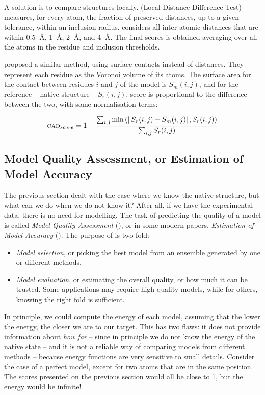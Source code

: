 A solution is to compare structures locally. 
\LDDT{} (Local Distance Difference Test) \citep{lddt} 
measures, for every atom, the fraction of preserved  distances, up to a given tolerance, within an inclusion radius.
\LDDT{} considers all inter-atomic distances that are within 0.5 $\SI{}{\angstrom}$, 1 $\SI{}{\angstrom}$, 2 $\SI{}{\angstrom}$, and 4 $\SI{}{\angstrom}$.
The final scores is obtained averaging over all the atoms in the residue and inclusion thresholds.

\citet{cad} proposed a similar method, using surface contacts instead of distances. 
They represent each residue as the Voronoi volume of its atoms.
The surface area for the contact between residues $i$ and $j$ of the model is $S_m(i,j)$, and for the reference -- native structure -- $S_r(i,j)$.
\CAD{} score is proportional to the difference between the two, with some normalisation terms:

\begin{equation*}
\textsc{cad}_{score} = 1 - \frac{\sum_{i,j} \min\left( \left| \: S_{r}(i, j) - S_{m}(i, j)\right|, S_{r}(i, j)\right)}{\sum_{i,j} S_{r}(i, j)}
\end{equation*}

\subsection[Model Quality Assessment]{Model Quality Assessment, or Estimation of Model Accuracy}
The previous section dealt with the case where we know the native structure, but what can we do when we do not know it?
After all, if we have the experimental data, there is no need for modelling.
The task of predicting the quality of a model is called \emph{Model Quality Assessment} (\MQA), or in some modern papers, \emph{Estimation of Model Accuracy} (\EMA).
The purpose of \MQA{} is two-fold:

\begin{itemize}
\item \emph{Model selection}, or picking the best model from an ensemble generated by one or different methods.
\item \emph{Model evaluation}, or estimating the overall quality, or how much it can be trusted.
Some applications may require high-quality models, while for others, knowing the right fold is sufficient.
\end{itemize}

In principle, we could compute the energy of each model, assuming that the lower the energy, the closer we are to our target.   
This has two flaws: it does not provide information about \emph{how far} -- since in principle we do not know the energy of the native state -- and it is not a reliable way of comparing models from different methods -- because energy functions are very sensitive to small details.
Consider the case of a perfect model, except for two atoms that are in the same position.
The scores presented on the previous section would all be close to 1, but the energy would be infinite!


